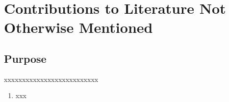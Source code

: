 \chapter{Contributions to Literature Not Otherwise Mentioned}
\section{Purpose}
xxxxxxxxxxxxxxxxxxxxxxxxxx
\begin{enumerate}
 \item xxx
\end{enumerate}


